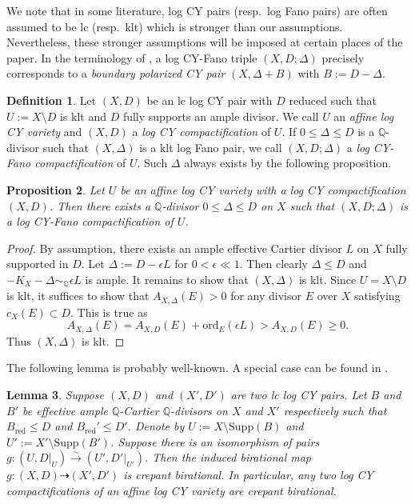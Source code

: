 \documentclass[reqno, 12pt]{amsart}
\newtheorem{prop}{Proposition}[section]
\newtheorem{lem}[prop]{Lemma}
\theoremstyle{definition}
\newtheorem{defn}[prop]{Definition}
\newcommand{\bQ}{\mathbb{Q}}
\newcommand{\Supp}{\mathrm{Supp}}
\newcommand{\ord}{\mathrm{ord}}
\newcommand{\red}{\mathrm{red}}
\numberwithin{equation}{section}
\begin{document}
We note that in some literature, log CY pairs (resp.\ log Fano pairs) are often assumed to be lc (resp.\ klt) which is stronger than our assumptions. Nevertheless,  these stronger assumptions will be imposed at certain places of the paper. In the terminology of \cite{BABWILD, BL24}, a log CY-Fano triple $(X,D;\Delta)$ precisely corresponds to a \emph{boundary polarized CY pair} $(X,\Delta+ B)$ with $B:= D-\Delta$.

\begin{defn}\label{def:affine-CY}
Let $(X,D)$ be an lc log CY pair with $D$ reduced such that $U:= X\setminus D$ is klt and $D$ fully supports an ample divisor. We call $U$ an \emph{affine log CY variety} and $(X,D)$ a \emph{log CY compactification} of $U$. If $0\leq \Delta \leq D$ is a $\bQ$-divisor such that $(X,\Delta)$ is a klt log Fano pair, we call $(X,D;\Delta)$  a \emph{log CY-Fano compactification} of $U$. Such $\Delta$ always exists by the following proposition.
\end{defn}

\begin{prop}\label{prop:log-CY-comp}
Let $U$ be an affine log CY variety with a log CY compactification $(X,D)$. Then there exists a $\bQ$-divisor $0\leq \Delta\leq D$ on $X$ such that $(X,D;\Delta)$ is a log CY-Fano compactification of $U$.
\end{prop}

\begin{proof}
By assumption, there exists an ample effective Cartier divisor $L$ on $X$ fully supported in $D$. Let $\Delta := D-\epsilon L$ for $0<\epsilon\ll 1$. Then clearly $\Delta\leq D$ and $-K_X-\Delta\sim_{\bQ} \epsilon L$ is ample. It remains to show that $(X,\Delta)$ is klt. Since $U = X\setminus D$ is klt, it suffices to show that $A_{X,\Delta}(E)>0$ for any divisor $E$ over $X$ satisfying $c_X(E)\subset D$. This is true as 
\[
A_{X,\Delta}(E) = A_{X,D}(E) + \ord_E(\epsilon L) > A_{X,D}(E) \geq 0. 
\]
Thus $(X,\Delta)$ is klt. 
\end{proof}

The following lemma is probably well-known. A special case can be found in \cite[Lemma 1.4(2)]{GHK15}.

\begin{lem}\label{lem:cbir}
 Suppose $(X,D)$ and $(X',D')$ are two lc log CY pairs. Let $B$ and $B'$ be effective ample $\bQ$-Cartier $\bQ$-divisors on $X$ and $X'$ respectively such that $B_{\red}\leq D$ and $B_{\red}'\leq D'$. 
 Denote by $U:=X\setminus \Supp(B)$ and $U':=X'\setminus \Supp(B')$. Suppose there is an isomorphism of pairs $g: (U, D|_U) \xrightarrow{\sim} (U', D'|_{U'})$. Then the induced birational map $g:(X,D) \dashrightarrow (X',D')$ is crepant birational. In particular, any two log CY compactifications of an affine log CY variety are crepant birational.
\end{lem}
\end{document}
